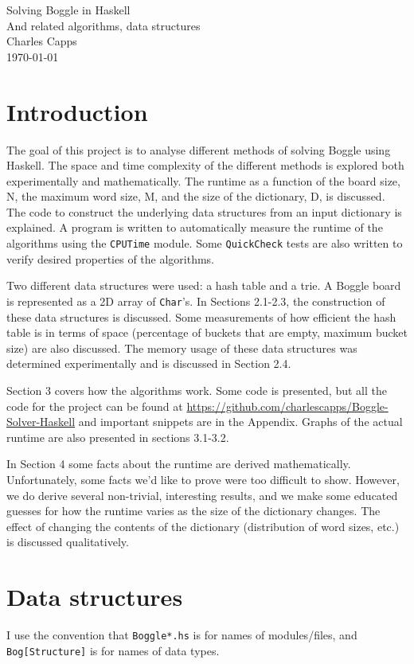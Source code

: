 \documentclass{article}
\begin{document}
 
\begin{center}
\Huge{Solving Boggle in Haskell} \\
\LARGE{And related algorithms, data structures \\ Charles Capps} \\ 
\today \\

\end{center}
\tableofcontents
\section{Introduction}
The goal of this project is to analyse different methods of solving Boggle using Haskell. The space and time complexity of the different methods is explored both experimentally and mathematically. The runtime as a function of the board size, N, the maximum word size, M, and the size of the dictionary, D, is discussed. The code to construct the underlying data structures from an input dictionary is explained. A program is written to automatically measure the runtime of the algorithms using the \verb=CPUTime= module. Some \verb=QuickCheck= tests are also written to verify desired properties of the algorithms. 

 Two different data structures were used: a hash table and a trie. A Boggle board is represented as a 2D array of \verb=Char='s. In Sections 2.1-2.3, the construction of these data structures is discussed. Some measurements of how efficient the hash table is in terms of space (percentage of buckets that are empty, maximum bucket size) are also discussed. The memory usage of these data structures was determined experimentally and is discussed in Section 2.4. 

Section 3 covers how the algorithms work. Some code is presented, but all the code for the project can be found at \url{https://github.com/charlescapps/Boggle-Solver-Haskell} and important snippets are in the Appendix. Graphs of the actual runtime are also presented in sections 3.1-3.2. 

In Section 4 some facts about the runtime are derived mathematically. Unfortunately, some facts we'd like to prove were too difficult to show. However, we do derive several non-trivial, interesting results, and we make some educated guesses for how the runtime varies as the size of the dictionary changes. The effect of changing the contents of the dictionary (distribution of word sizes, etc.) is discussed qualitatively.  

\section{Data structures}
I use the convention that \verb=Boggle*.hs= is for names of modules/files, and \verb=Bog[Structure]= is for names of data types. 
\end{document}
